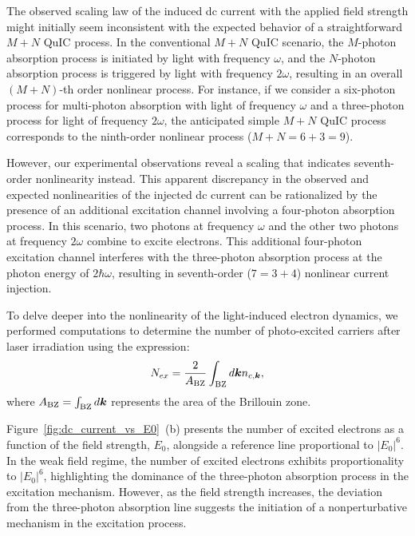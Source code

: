 The observed scaling law of the induced dc current with the applied field strength might initially
seem inconsistent with the expected behavior of a straightforward $M+N$ \gls{QuIC} process. In the
conventional $M+N$ \gls{QuIC} scenario, the $M$-photon absorption process is initiated by light with frequency $\omega$, and the $N$-photon absorption process is triggered by light with frequency $2\omega$, resulting in an overall $(M+N)$-th order nonlinear process. For instance, if we consider a six-photon process for multi-photon absorption with light of frequency $\omega$ and a three-photon process for light of frequency $2\omega$, the anticipated simple $M+N$ QuIC process corresponds to the ninth-order nonlinear process ($M+N=6+3=9$).

However, our experimental observations reveal a scaling that indicates seventh-order nonlinearity instead. This apparent discrepancy in the observed and expected nonlinearities of the injected dc current can be rationalized by the presence of an additional excitation channel involving a four-photon absorption process. In this scenario, two photons at frequency $\omega$ and the other two photons at frequency $2\omega$ combine to excite electrons. This additional four-photon excitation channel interferes with the three-photon absorption process at the photon energy of $2\hbar \omega$, resulting in seventh-order ($7=3+4$) nonlinear current injection.

To delve deeper into the nonlinearity of the light-induced electron dynamics, we performed computations to determine the number of photo-excited carriers after laser irradiation using the expression:
\begin{align}
N_{ex} = \frac{2}{A_{\mathrm{BZ}}}\int_{\mathrm{BZ}} d\boldsymbol{k} n_{c,\boldsymbol{k}}, 
\end{align}
where $A_{\mathrm{BZ}}=\int_{\mathrm{BZ}} d\boldsymbol{k}$ represents the area of the Brillouin zone.

Figure~\ref{fig:dc_current_vs_E0}~(b) presents the number of excited electrons as a function of the field strength, $E_0$, alongside a reference line proportional to $|E_0|^6$. In the weak field regime, the number of excited electrons exhibits proportionality to $|E_0|^6$, highlighting the dominance of the three-photon absorption process in the excitation mechanism. However, as the field strength increases, the deviation from the three-photon absorption line suggests the initiation of a nonperturbative mechanism in the excitation process.

